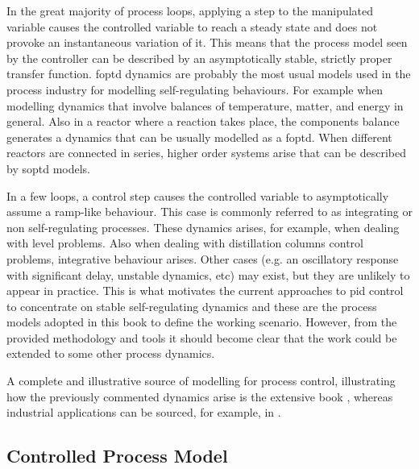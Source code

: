 In the great majority of process loops, applying a step to the manipulated variable causes the controlled variable to reach a steady state and does not provoke an instantaneous variation of it. This means that the process model seen by the controller can be described by an asymptotically stable, strictly proper transfer function. \gls{foptd} dynamics are probably the most usual models used in the process industry for modelling self-regulating behaviours. For example when modelling dynamics that involve balances of temperature, matter, and energy in general. Also in a reactor where a reaction takes place, the components balance generates a dynamics that can be usually modelled as a \gls{foptd}. When different reactors are connected in series, higher order systems arise that can be described by \gls{soptd} models. 

In a few loops, a control step causes the controlled variable to asymptotically assume a ramp-like behaviour. This case is commonly referred to as  integrating or non self-regulating processes. These dynamics arises, for example, when dealing with level problems. Also when dealing with distillation columns control problems, integrative behaviour arises. Other cases (e.g. an oscillatory response with significant delay, unstable dynamics, etc) may exist, but they are unlikely to appear in practice. This is what motivates the current approaches to \gls{pid} control to concentrate on stable self-regulating dynamics and these are the process models adopted in this book to define the working scenario. However, from the provided methodology and tools it should become clear that the work could be extended to some other process dynamics.

A complete and illustrative source of modelling for process control, illustrating how the previously commented dynamics arise is the extensive book \citep{MarlinBook}, whereas industrial applications can be sourced, for example, in  \citep{VilanovaBook2012}.


\subsection{Controlled Process Model}
\label{sec:2.1}

